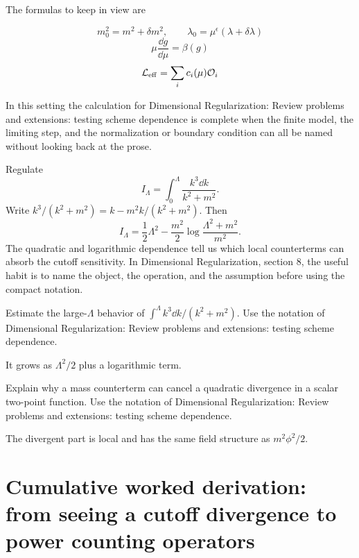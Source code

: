 The formulas to keep in view are

\[
  m_0^2=m^2+\delta m^2,\qquad \lambda_0=\mu^\epsilon(\lambda+\delta\lambda)
\]
\[
  \mu\frac{\dd g}{\dd\mu}=\beta(g)
\]
\[
  \mathcal L_{\mathrm{eff}}=\sum_i c_i(\mu)\mathcal O_i
\]

In this setting the calculation for Dimensional Regularization: Review problems and extensions: testing scheme dependence is complete when the finite model, the limiting step, and the normalization or boundary condition can all be named without looking back at the prose.




\begin{example}
Regulate
\[
  I_\Lambda=\int_0^\Lambda\frac{k^3\dd k}{k^2+m^2}.
\]
Write \(k^3/(k^2+m^2)=k-m^2k/(k^2+m^2)\).  Then
\[
  I_\Lambda=\frac12\Lambda^2-\frac{m^2}{2}\log\frac{\Lambda^2+m^2}{m^2}.
\]
The quadratic and logarithmic dependence tell us which local counterterms can absorb the cutoff sensitivity.  In Dimensional Regularization, section 8, the useful habit is to name the object, the operation, and the assumption before using the compact notation.
\end{example}



\begin{exercise}
Estimate the large-\(\Lambda\) behavior of \(\int^\Lambda k^3\dd k/(k^2+m^2)\).  Use the notation of Dimensional Regularization: Review problems and extensions: testing scheme dependence.
\begin{answer}
It grows as \(\Lambda^2/2\) plus a logarithmic term.
\end{answer}
\end{exercise}

\begin{exercise}
Explain why a mass counterterm can cancel a quadratic divergence in a scalar two-point function.  Use the notation of Dimensional Regularization: Review problems and extensions: testing scheme dependence.
\begin{answer}
The divergent part is local and has the same field structure as \(m^2\phi^2/2\).
\end{answer}
\end{exercise}



\section{Cumulative worked derivation: from seeing a cutoff divergence to power counting operators}

